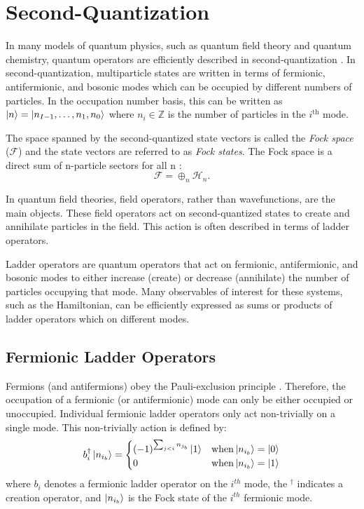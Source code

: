 \section{Second-Quantization}
\label{sec:theory}

In many models of quantum physics, such as quantum field theory and quantum chemistry, quantum operators are efficiently described in second-quantization \cite{Sakurai_Napolitano_2020}.
In second-quantization, multiparticle states are written in terms of fermionic, antifermionic, and bosonic modes which can be occupied by different numbers of particles.
In the occupation number basis, this can be written as $\ket{n} = \ket{n_{I-1}, \dots, n_1, n_0}$ where $n_i \in \mathbb{Z}$ is the number of particles in the $i^\text{th}$ mode.

The space spanned by the second-quantized state vectors is called the \textit{Fock space} ($\mathcal{F}$) and the state vectors are referred to as \textit{Fock states}.
The Fock space is a direct sum of n-particle sectors for all n \cite{Schwartz_2013}:
\begin{equation}
    \mathcal{F} = \oplus_n \mathcal{H}_n.
\end{equation}

In quantum field theories, field operators, rather than wavefunctions, are the main objects.
These field operators act on second-quantized states to create and annihilate particles in the field.
This action is often described in terms of ladder operators.

Ladder operators are quantum operators that act on fermionic, antifermionic, and bosonic modes to either increase (create) or decrease (annihilate) the number of particles occupying that mode.
Many observables of interest for these systems, such as the Hamiltonian, can be efficiently expressed as sums or products of ladder operators which on different modes.

\subsection{Fermionic Ladder Operators}
\label{subsec:fermionic-operators}

Fermions (and antifermions) obey the Pauli-exclusion principle \cite{pauli1925zusammenhang}.
Therefore, the occupation of a fermionic (or antifermionic) mode can only be either occupied or unoccupied.
Individual fermionic ladder operators only act non-trivially on a single mode.
This non-trivially action is defined by:
\begin{equation}
    \label{eq:fermionic-creation}
    b_i^\dagger \ket{n_{i_b}} = 
    \begin{cases} 
        (-1)^{\sum_{j < i} n_{j_b}} \ket{1}  & {\rm when} \ket{n_{i_b}} = \ket{0} \\
        0 & {\rm when} \ket{n_{i_b}} = \ket{1}
    \end{cases}
\end{equation}
where $b_i$ denotes a fermionic ladder operator on the $i^{th}$ mode, the $^\dagger$ indicates a creation operator, and $\ket{n_{i_b}}$ is the Fock state of the $i^{th}$ fermionic mode.

